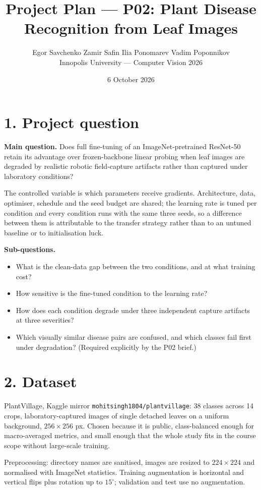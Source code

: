 \documentclass[10pt,a4paper]{article}
\title{\vspace{-1.4cm}\textbf{Project Plan --- P02: Plant Disease Recognition from Leaf Images}\vspace{-0.2cm}}
\author{\small Egor Savchenko \quad Zamir Safin \quad Ilia Ponomarev \quad Vadim Poponnikov\\[2pt]
\small Innopolis University --- Computer Vision 2026\vspace{-0.3cm}}
\date{\small 6 October 2026}
\begin{document}
\maketitle

\section*{1. Project question}

\textbf{Main question.} Does full fine-tuning of an ImageNet-pretrained ResNet-50 retain its
advantage over frozen-backbone linear probing when leaf images are degraded by realistic robotic
field-capture artifacts rather than captured under laboratory conditions?

The controlled variable is which parameters receive gradients. Architecture, data, optimiser,
schedule and the seed budget are shared; the learning rate is tuned per condition and every
condition runs with the same three seeds, so a difference between them is attributable to the
transfer strategy rather than to an untuned baseline or to initialisation luck.

\textbf{Sub-questions.}
\begin{itemize}
  \item What is the clean-data gap between the two conditions, and at what training cost?
  \item How sensitive is the fine-tuned condition to the learning rate?
  \item How does each condition degrade under three independent capture artifacts at three severities?
  \item Which visually similar disease pairs are confused, and which classes fail first under
        degradation? (Required explicitly by the P02 brief.)
\end{itemize}

\section*{2. Dataset}

PlantVillage, Kaggle mirror \texttt{mohitsingh1804/plantvillage}: 38 classes across 14 crops,
laboratory-captured images of single detached leaves on a uniform background, $256\times256$ px.
Chosen because it is public, class-balanced enough for macro-averaged metrics, and small enough that
the whole study fits in the course scope without large-scale training.

Preprocessing: directory names are sanitised, images are resized to $224\times224$ and normalised
with ImageNet statistics. Training augmentation is horizontal and vertical flips plus rotation up to
$15^{\circ}$; validation and test use no augmentation.
\end{document}
